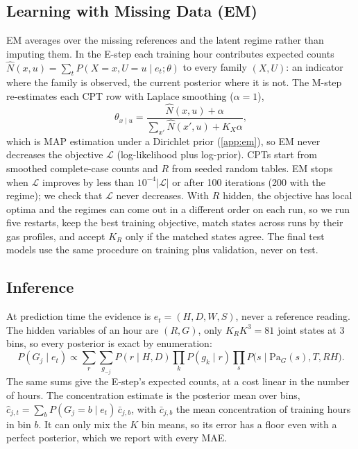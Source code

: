 \subsection{Learning with Missing Data (EM)}
\label{sec:em}
EM averages over the missing references and the latent regime rather than
imputing them. In the E-step each training hour contributes expected counts
$\hat N(x,u) = \sum_t P(X{=}x, U{=}u \mid e_t; \theta)$ to every family
$(X, U)$: an indicator where the family is observed, the current posterior
where it is not. The M-step re-estimates each CPT row with Laplace smoothing
($\alpha = 1$),
\begin{equation}
  \theta_{x \mid u} = \frac{\hat N(x,u) + \alpha}{\sum_{x'} \hat N(x',u) + K_X \alpha},
\end{equation}
which is MAP estimation under a Dirichlet prior (\cref{app:em}), so EM never
decreases the objective $\mathcal{L}$ (log-likelihood plus log-prior). CPTs
start from smoothed complete-case counts and $R$ from seeded random tables. EM
stops when $\mathcal{L}$ improves by less than $10^{-4}\lvert\mathcal{L}\rvert$
or after 100 iterations (200 with the regime); we check that $\mathcal{L}$
never decreases. With $R$ hidden, the objective has local optima and the
regimes can come out in a different order on each run, so we run five restarts,
keep the best training objective, match states across runs by their gas
profiles, and accept $K_R$ only if the matched states agree. The final test
models use the same procedure on training plus validation, never on test.

\subsection{Inference}
\label{sec:inference}
At prediction time the evidence is $e_t = (H, D, W, S)$, never a reference
reading. The hidden variables of an hour are $(R, G)$, only $K_R K^3 = 81$
joint states at 3 bins, so every posterior is exact by enumeration:
\begin{equation}
  P(G_j \mid e_t) \propto \sum_{r} \sum_{g_{-j}}
  P(r \mid H, D) \prod_{k} P(g_k \mid r)
  \prod_{s} P\bigl(s \mid \mathrm{Pa}_G(s), T, \mathit{RH}\bigr).
\end{equation}
The same sums give the E-step's expected counts, at a cost linear in the
number of hours. The concentration estimate is the posterior mean over bins,
$\hat c_{j,t} = \sum_b P(G_j{=}b \mid e_t)\,\bar c_{j,b}$, with $\bar c_{j,b}$
the mean concentration of training hours in bin $b$. It can only mix the $K$
bin means, so its error has a floor even with a perfect posterior, which we
report with every MAE.